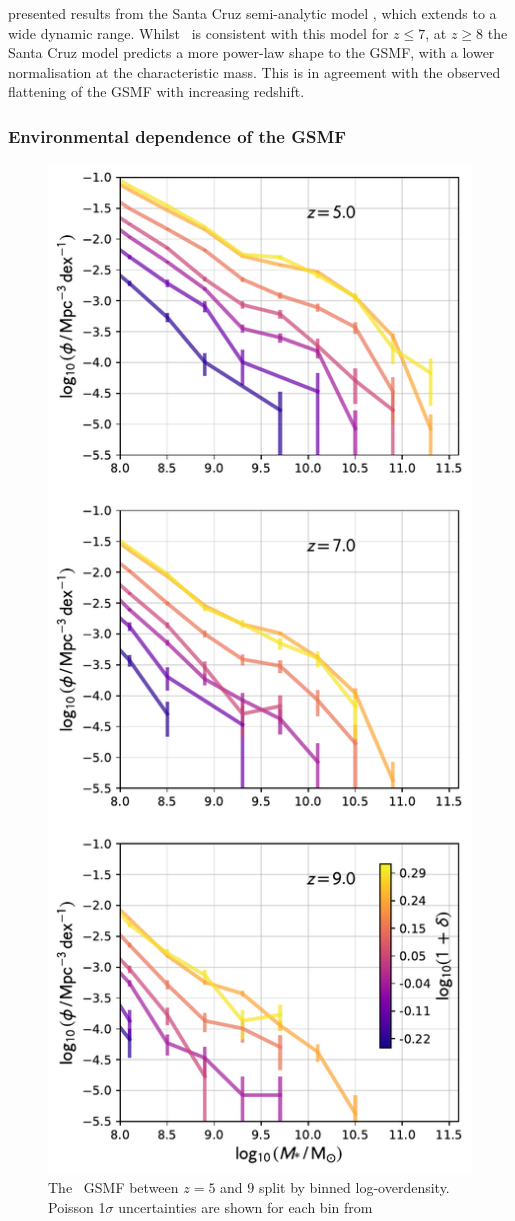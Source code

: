 \cite{yung_semi-analytic_2019} presented results from the Santa Cruz semi-analytic model \citep{somerville_star_2015}, which extends to a wide dynamic range.
Whilst \flares\ is consistent with this model for $z \leqslant 7$, at $z \geqslant 8$ the Santa Cruz model predicts a more power-law shape to the GSMF, with a lower normalisation at the characteristic mass.
This is in agreement with the observed flattening of the GSMF with increasing redshift.


\subsubsection{Environmental dependence of the GSMF}
\label{sec:env_gsmf}

\begin{figure}
	\includegraphics[width=\columnwidth]{images/gsmf_overdensity.pdf}
    \caption{The \flares\ GSMF between $z = 5$ and $9$ split by binned log-overdensity.
    Poisson 1$\sigma$ uncertainties are shown for each bin from }
\end{figure}
